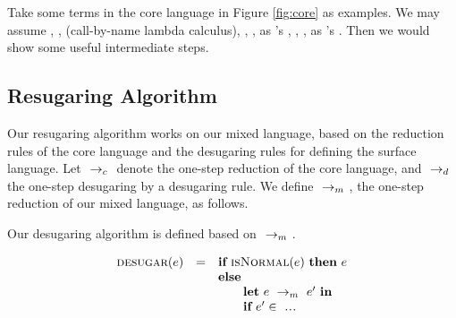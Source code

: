 Take some terms in the core language in Figure \ref{fig:core} as examples.
We may assume , ,  (call-by-name lambda calculus), , ,  as 's , , \m{$\lambda$},  as 's . Then we would show some useful intermediate steps.


\subsection{Resugaring Algorithm}

Our resugaring algorithm works on our mixed language, based on the reduction rules of the core language and the desugaring rules for defining the surface language. Let $~\rightarrow_c~$ denote the one-step reduction of the core language, and $~\rightarrow_d~$ the one-step desugaring by a desugaring rule. We define $~\rightarrow_m~$, the one-step reduction of our mixed language, as follows.

{}

{}

{
}

Our desugaring algorithm is defined based on $~\rightarrow_m~$.

\[
\begin{array}{llll}
\mbox{\sc desugar} (e) &=& \mbox{\rm \bf if}~\mbox{\sc isNormal}(e)~\mbox{\rm \bf then}~e\\
              & & \mbox{\rm \bf else}~\\
							& & \qquad \mbox{\rm \bf let}~e ~\rightarrow_m~e'~\mbox{\rm \bf in}\\
							& & \qquad \mbox{\rm \bf if}~e' \in~\mbox{\sc ...}
\end{array}
\]

